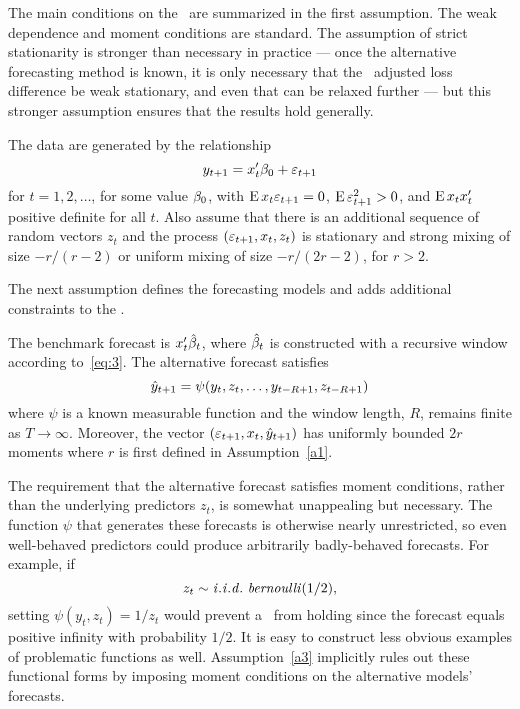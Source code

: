 The main conditions on the \dgp\ are summarized in the first
assumption.  The weak dependence and moment conditions are
standard. The assumption of strict stationarity is stronger than
necessary in practice --- once the alternative forecasting method is
known, it is only necessary that the \oos\ adjusted loss difference be
weak stationary, and even that can be relaxed further --- but this
stronger assumption ensures that the results hold generally.

{}
\begin{asmp}\label{a1}%
  The data are generated by the relationship
  \begin{equation}
    y_{t+1} = x_t'\btrue + \ep_{t+1}
  \end{equation}
  for $t=1,2,\dots$, for some value $\btrue$, with $\operatorname{E} x_t \varepsilon_{t+1} =
  0$, $\operatorname{E} \varepsilon_{t+1}^2 > 0$, and $\operatorname{E} x_t x_t'$ positive definite for
  all $t$. Also assume that there is an additional sequence of random
  vectors $z_t$ and the process $(\varepsilon_{t+1}, x_t, z_t)$ is stationary
  and strong mixing of size $-r/(r-2)$ or uniform mixing of size
  $-r/(2r-2)$, for $r > 2$.
\end{asmp}

The next assumption defines the forecasting models and adds additional
constraints to the \dgp.

{}
\begin{asmp}\label{a3}%
  The benchmark forecast is $x_t'\hat{\beta}_t$, where $\hat{\beta}_t$ is constructed
  with a recursive window according to~\eqref{eq:3}. The alternative
  forecast satisfies
  \begin{equation}
    \hat{y}_{t+1} = \psi(y_t,z_t,\dots,y_{t-R+1}, z_{t-R+1})
  \end{equation}
  where $\psi$ is a known measurable function and the window length,
  $R$, remains finite as $T \to \infty$. Moreover, the vector
  $(\varepsilon_{t+1}, x_t, \hat{y}_{t+1})$ has uniformly bounded $2 r$ moments
  where $r$ is first defined in Assumption~\ref{a1}.
\end{asmp}

The requirement that the alternative forecast satisfies moment
conditions, rather than the underlying predictors $z_t$, is somewhat
unappealing but necessary. The function $\psi$ that generates these
forecasts is otherwise nearly unrestricted, so even well-behaved predictors
could produce arbitrarily badly-behaved forecasts. For example, if
\begin{equation*}
  z_t \sim \mathit{i.i.d.}~\mathit{bernoulli}(1/2),
\end{equation*}
setting $\psi(y_t, z_t) = 1/z_t$ would prevent a \clt\ from holding
since the forecast equals positive infinity with probability $1/2$. It
is easy to construct less obvious examples of problematic functions as
well. Assumption~\ref{a3} implicitly rules out these functional forms
by imposing moment conditions on the alternative models' forecasts.

